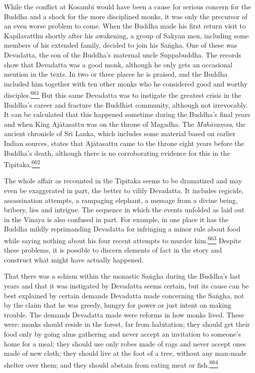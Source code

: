 While the conflict at Kosambī would have been a cause for serious
concern for the Buddha and a shock for the more disciplined monks, it
was only the precursor of an even worse problem to come. When the Buddha
made his first return visit to Kapilavatthu shortly after his awakening,
a group of Sakyan men, including some members of his extended family,
decided to join his Saṅgha. One of these was Devadatta, the son of the
Buddha's maternal uncle Suppabuddha. The records show that Devadatta was
a good monk, although he only gets an occasional mention in the texts.
In two or three places he is praised, and the Buddha included him
together with ten other monks who he considered good and worthy
disciples.\label{footprints_split_016.html_fnref661}\hyperref[footprints_split_025.htmlux5cux23fn661]{\textsuperscript{661}}
But this same Devadatta was to instigate the greatest crisis in the
Buddha's career and fracture the Buddhist community, although not
irrevocably. It can be calculated that this happened sometime during the
Buddha's final years and when King Ajātasattu was on the throne of
Magadha. The \emph{Mahāvaṃsa}, the ancient chronicle of Sri Lanka, which
includes some material based on earlier Indian sources, states that
Ajātasattu came to the throne eight years before the Buddha's death,
although there is no corroborating evidence for this in the
Tipitaka.\label{footprints_split_016.html_fnref662}\hyperref[footprints_split_025.htmlux5cux23fn662]{\textsuperscript{662}}

The whole affair as recounted in the Tipitaka seems to be dramatized and
may even be exaggerated in part, the better to vilify Devadatta. It
includes regicide, assassination attempts, a rampaging elephant, a
message from a divine being, bribery, lies and intrigue. The sequence in
which the events unfolded as laid out in the Vinaya is also confused in
part. For example, in one place it has the Buddha mildly reprimanding
Devadatta for infringing a minor rule about food while saying nothing
about his four recent attempts to murder
him.\label{footprints_split_016.html_fnref663}\hyperref[footprints_split_025.htmlux5cux23fn663]{\textsuperscript{663}}
Despite these problems, it is possible to discern elements of fact in
the story and construct what might have actually happened.

That there was a schism within the monastic Saṅgha during the Buddha's
last years and that it was instigated by Devadatta seems certain, but
its cause can be best explained by certain demands Devadatta made
concerning the Saṅgha, not by the claim that he was greedy, hungry for
power or just intent on making trouble. The demands Devadatta made were
reforms in how monks lived. These were: monks should reside in the
forest, far from habitation; they should get their food only by going
alms gathering and never accept an invitation to someone's home for a
meal; they should use only robes made of rags and never accept ones made
of new cloth; they should live at the foot of a tree, without any
man-made shelter over them; and they should abstain from eating meat or
fish.\label{footprints_split_016.html_fnref664}\hyperref[footprints_split_025.htmlux5cux23fn664]{\textsuperscript{664}}

